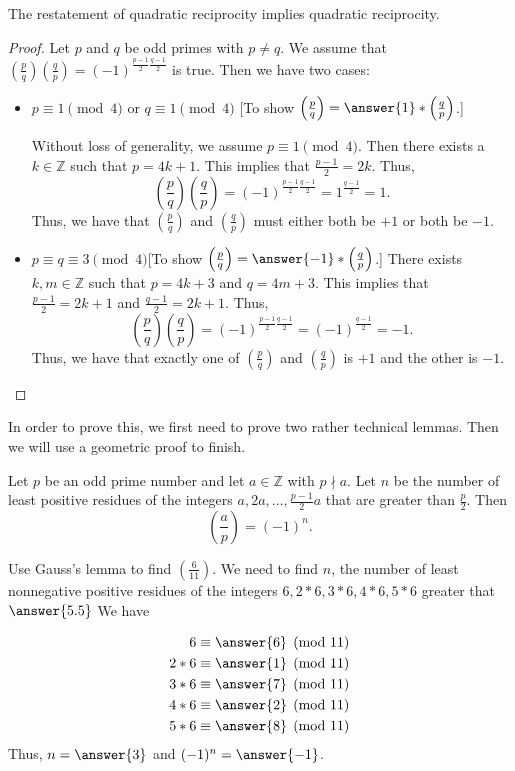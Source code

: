 \documentclass{ximera}
\theoremstyle{definition}
\begin{document}
\begin{theorem}The restatement of quadratic reciprocity implies quadratic reciprocity.
\end{theorem}
\begin{proof}
 Let $p$ and $q$ be odd primes with $p\neq q$. We assume that $\left(\frac{p}{q}\right)\left(\frac{q}{p}\right)=(-1)^{\frac{p-1}{2}\frac{q-1}{2}}$ is true. Then we have two cases:
 
\begin{itemize}
 \item $p\equiv 1 \pmod 4$ or $q\equiv 1 \pmod 4$ [To show $\left(\frac{p}{q}\right)=\answer{1}
* \left(\frac{q}{p}\right)$.]

Without loss of generality, we assume $p\equiv 1 \pmod 4$. Then there exists a $k\in\mathbb{Z}$ such that $p=4k+1$. This implies that $\frac{p-1}{2}=2k$. Thus, \[\left(\frac{p}{q}\right)\left(\frac{q}{p}\right)=(-1)^{\frac{p-1}{2}\frac{q-1}{2}}=1^\frac{q-1}{2}=1.\]
Thus, we have that $\left(\frac{p}{q}\right)$ and $\left(\frac{q}{p}\right)$ must either both be $+1$ or both be $-1$.

\item $p\equiv q\equiv 3 \pmod 4$[To show $\left(\frac{p}{q}\right)=\answer{-1}
* \left(\frac{q}{p}\right)$.]
 There exists $k,m\in\mathbb{Z}$ such that $p=4k+3$ and $q=4m+3$. This implies that $\frac{p-1}{2}=2k+1$ and $\frac{q-1}{2}=2k+1$. Thus, \[\left(\frac{p}{q}\right)\left(\frac{q}{p}\right)=(-1)^{\frac{p-1}{2}\frac{q-1}{2}}=(-1)^\frac{q-1}{2}=-1.\]
Thus, we have that exactly one of $\left(\frac{p}{q}\right)$ and $\left(\frac{q}{p}\right)$ is $+1$ and the other is $-1$. \qedhere
\end{itemize}
\end{proof}

In order to prove this, we first need to prove two rather technical lemmas. Then we will use a geometric proof to finish.

\begin{theorem}
Let $p$ be an odd prime number and let $a\in\mathbb{Z}$ with $p\nmid a$. Let $n$ be the number of least positive residues of the integers $a,2a,\dots, \frac{p-1}{2} a$ that are greater than $\frac{p}{2}$. Then 
\[\left(\frac{a}{p}\right)=(-1)^n.\]
\end{theorem}

\begin{question}
 Use Gauss's lemma to find $\left(\frac{6}{11}\right)$. We need to find $n$, the number of least nonnegative positive residues of the integers $6,2*6,3*6,4*6,5*6$ greater that $\answer{5.5}
 $
 We have 
 
\begin{align*}
 6\equiv \answer{6}
 \pmod{11}\\
 2*6\equiv\answer{1}
 \pmod{11}\\
 3*6\equiv\answer{7}
 \pmod{11}\\
 4*6\equiv\answer{2}
 \pmod{11}\\
 5*6\equiv\answer{8}
 \pmod{11}
\end{align*}
Thus, $n=\answer{3}
$ and $(-1)^n=\answer{-1}
$.
\end{question}
\end{document}
